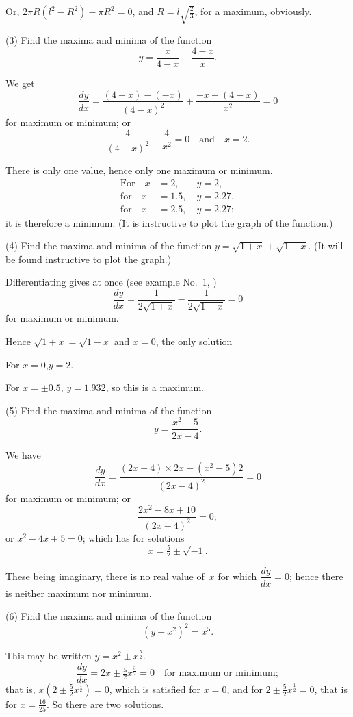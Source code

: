 \documentclass[12pt]{book}[2005/09/16]
\newcommand{\DPPageSep}[2]{\Pagelabel{#2}}
\newcommand{\Pagelabel}[1]
  {\phantomsection\label{#1}}
\newcommand{\Pageref}[2][p.]{%
  \ifthenelse{\not\equal{#1}{}}{%
    \hyperref[#2]{#1~\pageref{#2}}%
  }{%
    \hyperref[#2]{\pageref{#2}}%
  }%
}
\newcommand{\DPtypo}[2]{#2}%
\newcommand{\efrac}[2]{\frac{#1}{#2}}
\begin{document}
Or, $2\pi R(l^2 - R^2) - \pi R^2 = 0$, and $R = l\sqrt{\tfrac{2}{3}}$, for a maximum,
obviously.
\DPPageSep{118.png}{106}%

(3) Find the maxima and minima of the function
\[
y = \dfrac{x}{4-x} + \dfrac{4-x}{x}.
\]

We get
\[
\dfrac{dy}{dx} = \dfrac{(4-x)-(-x)}{(4-x)^2} + \dfrac{-x - (4-x)}{x^2} = 0
\]
for maximum or minimum; or
\[
\dfrac{4}{(4-x)^2} - \dfrac{4}{x^2} = 0 \quad\text{and}\quad x = 2.
\]

There is only one value, hence only one maximum
or minimum.
\begin{align*}
\text{For}\quad x &= 2,\phantom{.5}\quad y = 2, \\
\text{for}\quad x &= 1.5,\quad y = 2.27,   \\
\text{for}\quad x &= 2.5,\quad y = 2.27;
\end{align*}
it is therefore a minimum. (It is instructive to plot
the graph of the function.)

(4) Find the maxima and minima of the function
$y = \sqrt{1+x} + \sqrt{1-x}$. (It will be found instructive to
plot the graph.)

Differentiating gives at once (see example No.~1,
\Pageref{ExNo1})
\[
\dfrac{dy}{dx} = \dfrac{1}{2\sqrt{1+x}} - \dfrac{1}{2\sqrt{1-x}} = 0
\]
for maximum or minimum.

Hence $\sqrt{1+x} = \sqrt{1-x}$ and $x = 0$, the only solution

For $x=0$,\quad $y=2$.

For $x=±0.5$, $y= 1.932$, so this is a maximum.
\DPPageSep{119.png}{107}%

(5) Find the maxima and minima of the function
\[
y = \dfrac{x^2-5}{2x-4}.
\]

We have
\[
\dfrac{dy}{dx} = \dfrac{(2x-4) × 2x - (x^2-5)2}{(2x-4)^2} = 0
\]
for maximum or minimum; or
\[
\dfrac{2x^2 - 8x + 10}{\DPtypo{(2x - 5)^2}{(2x - 4)^2}} = 0;
\]
or $x^2 - 4x + 5 = 0$; which has for solutions
\[
x = \tfrac{5}{2} ± \sqrt{-1}.
\]

These being imaginary, there is no real value of~$x$
for which $\dfrac{dy}{dx} = 0$; hence there is neither maximum nor
minimum.

(6) Find the maxima and minima of the function
\[
(y-x^2)^2 = x^5.
\]

This may be written $y = x^2 ± x^{\efrac{5}{2}}$.
\[
\dfrac{dy}{dx} = 2x ± \tfrac{5}{2} x^{\efrac{3}{2}} = 0 \quad\text{for maximum or minimum};
\]
that is, $x(2 ± \tfrac{5}{2} x^{\efrac{1}{2}}) = 0$, which is satisfied for $x = 0$,
and for $2 ± \tfrac{5}{2} x^{\efrac{1}{2}} = 0$, that is for $x=\tfrac{16}{25}$. So there are
two solutions.
\end{document}
